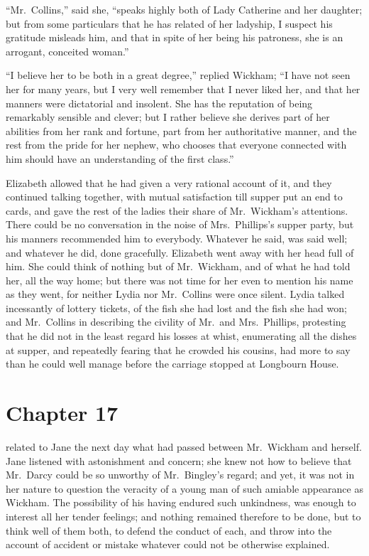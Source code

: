 ``Mr.\ Collins,'' said she, ``speaks highly both of Lady Catherine
and her daughter; but from some particulars that he has related
of her ladyship, I suspect his gratitude misleads him, and that in
spite of her being his patroness, she is an arrogant, conceited
woman.''

``I believe her to be both in a great degree,'' replied Wickham;
``I have not seen her for many years, but I very well remember that
I never liked her, and that her manners were dictatorial and
insolent.  She has the reputation of being remarkably sensible
and clever; but I rather believe she derives part of her abilities
from her rank and fortune, part from her authoritative manner,
and the rest from the pride for her nephew, who chooses that
everyone connected with him should have an understanding of
the first class.''

Elizabeth allowed that he had given a very rational account of it,
and they continued talking together, with mutual satisfaction
till supper put an end to cards, and gave the rest of the ladies
their share of Mr.\ Wickham's attentions.  There could be no
conversation in the noise of Mrs.\ Phillips's supper party, but
his manners recommended him to everybody.  Whatever he said,
was said well; and whatever he did, done gracefully.  Elizabeth
went away with her head full of him.  She could think of nothing
but of Mr.\ Wickham, and of what he had told her, all the way
home; but there was not time for her even to mention his name
as they went, for neither Lydia nor Mr.\ Collins were once silent.
Lydia talked incessantly of lottery tickets, of the fish she had
lost and the fish she had won; and Mr.\ Collins in describing the
civility of Mr.\ and Mrs.\ Phillips, protesting that he did not in
the least regard his losses at whist, enumerating all the dishes
at supper, and repeatedly fearing that he crowded his cousins,
had more to say than he could well manage before the carriage
stopped at Longbourn House.



\chapter{Chapter 17}


 related to Jane the next day what had passed between
Mr.\ Wickham and herself.  Jane listened with astonishment and
concern; she knew not how to believe that Mr.\ Darcy could be
so unworthy of Mr.\ Bingley's regard; and yet, it was not in her
nature to question the veracity of a young man of such amiable
appearance as Wickham.  The possibility of his having endured
such unkindness, was enough to interest all her tender feelings;
and nothing remained therefore to be done, but to think well of
them both, to defend the conduct of each, and throw into the
account of accident or mistake whatever could not be otherwise
explained.

